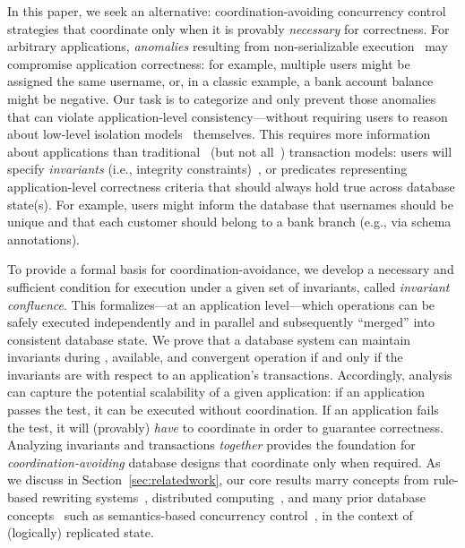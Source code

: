 In this paper, we seek an alternative: coordination-avoiding
concurrency control strategies that coordinate only when it is
provably \textit{necessary} for correctness. For arbitrary
applications, \textit{anomalies} resulting from non-serializable
execution~\cite{adya-isolation} may compromise application
correctness: for example, multiple users might be assigned the same
username, or, in a classic example, a bank account balance might be
negative. Our task is to categorize and only prevent those anomalies
that can violate application-level consistency---without requiring
users to reason about low-level isolation models~\cite{hat-vldb}
themselves. This requires more information about applications than
traditional~\cite{bernstein-book,gray-virtues} (but not
all~\cite{eswaran-consistency,korth-serializability,decomp-semantics,garciamolina-semantics,activedb-book,ic-survey,ic-survey-two})
transaction models: users will specify \textit{invariants} (i.e.,
integrity constraints)~\cite{traiger-tods}, or predicates representing
application-level correctness criteria that should always hold true
across database state(s). For example, users might inform the database
that usernames should be unique and that each customer should belong
to a bank branch (e.g., via schema annotations).

To provide a formal basis for coordination-avoidance, we develop a
necessary and sufficient condition for \cfree execution under a given
set of invariants, called \textit{invariant confluence}. This
\iconfluence formalizes---at an application level---which operations
can be safely executed independently and in parallel and subsequently
``merged'' into consistent database state. We prove that a database
system can maintain invariants during \cfree, available, and
convergent operation if and only if the invariants are \iconfluent
with respect to an application's transactions. Accordingly,
\iconfluence analysis can capture the potential scalability of a given
application: if an application passes the \iconfluence test, it can be
executed without coordination. If an application fails the test, it
will (provably) \textit{have} to coordinate in order to guarantee
correctness. Analyzing invariants and transactions \textit{together}
provides the foundation for \textit{coordination-avoiding} database
designs that coordinate only when required. As we discuss in
Section~\ref{sec:relatedwork}, our core results marry concepts from
rule-based rewriting systems~\cite{obs-confluence,termrewriting},
distributed computing~\cite{herlihy-apologizing,gilbert-cap,hat-vldb},
and many prior database
concepts~\cite{activedb-book,ic-survey,ic-survey-two} such as
semantics-based concurrency
control~\cite{sdd1,decomp-semantics,badrinath-semantics,garciamolina-semantics,korth-serializability,atomictransactions,weihl-thesis},
in the context of (logically) replicated state.

